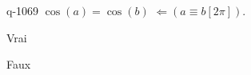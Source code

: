 \begin{truefalse}{q-1069}
$\cos(a)=\cos(b)$  $\Leftarrow \left(a\equiv b [2\pi]\right)$.
\item* Vrai
\item Faux
\end{truefalse}

